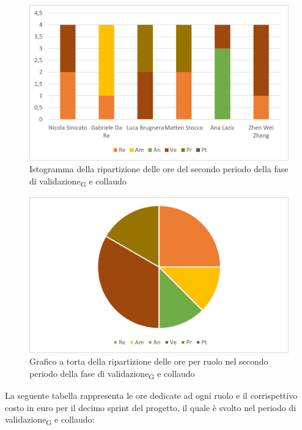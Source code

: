 \begin{figure}[H]
    \centering
    \includegraphics[scale=0.6]{img/grafi preventivo/istogrammi/validazione/periodo2.png}
    \caption{Istogramma della ripartizione delle ore del secondo periodo della fase di validazione\textsubscript{G} e collaudo}
\end{figure}
\begin{figure}[H]
    \centering
    \includegraphics[scale=0.6]{img/grafi preventivo/torta/validazione/periodo2.png}
    \caption{Grafico a torta della ripartizione delle ore per ruolo nel secondo periodo della fase di validazione\textsubscript{G} e collaudo}
\end{figure}
La seguente tabella rappresenta le ore dedicate ad ogni ruolo e il corrispettivo costo in euro per il decimo sprint del progetto, il quale è svolto nel periodo di validazione\textsubscript{G} e collaudo:

